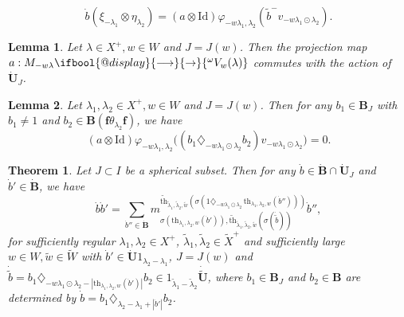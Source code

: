 \documentclass[10pt,a4paper]{amsart}
\makeatletter
\newtheorem{theorem}{Theorem}
\newtheorem{lemma}{Lemma}
\def\l{\lambda}
\renewcommand{\to}{%
   \ifbool{@display}{\longrightarrow}{\rightarrow}%
   }
\makeatother
\begin{document}
\begin{equation}\label{definition of thickening map}
\dot{b}(\xi_{-\lambda_1}\otimes \eta_{\lambda_2})=(a\otimes \mathrm{Id})\varphi_{-w\lambda_1,\lambda_2}(\tilde{b}^-v_{-w\lambda_1\odot\lambda_2}).   
\end{equation}

\begin{lemma}\label{lem:Demazure-UJ}
Let $\l \in X^+,w \in W$ and $J=J(w)$. Then the projection map $a: M_{-w \l} \to {^{\omega}V_{w}(\lambda)}$ commutes with the action of $\dot{\mathbf{U}}_J$.
\end{lemma}

\begin{lemma}\label{canonical basis of U dot acts on Verma}
Let $\lambda_1,\lambda_2\in X^+,w\in W$ and $J=J(w)$. Then for any $b_1\in \mathbf{B}_J$ with $b_1 \neq 1$ and $b_2\in \mathbf{B}(\mathbf{f}\theta_{\lambda_2}\mathbf{f})$, we have 
$$(a\otimes \mathrm{Id})\varphi_{-w\lambda_1,\lambda_2}\bigl((b_1\diamondsuit_{-w\lambda_1\odot\lambda_2}b_2)v_{-w\lambda_1\odot\lambda_2}\bigr)=0.$$
\end{lemma}

\begin{theorem}\label{thm:structure-multiplication}
Let $J \subset I$ be a spherical subset. Then for any $\dot{b}\in \dot{\mathbf{B}}\cap \dot{\mathbf{U}}_J$ and $\dot{b}'\in \dot{\mathbf{B}}$, we have
$$\dot{b}\dot{b}'=\sum_{\dot{b}''\in \dot{\mathbf{B}}}m_{\sigma(\mathrm{th}_{\lambda_1,\lambda_2,w}(\dot{b}')),\widetilde{\mathrm{th}}_{\tilde{\lambda}_1,\tilde{\lambda}_2,\tilde{w}}(\sigma(\dot{\tilde{b}}))}^{\widetilde{\mathrm{th}}_{\tilde{\lambda}_1,\tilde{\lambda}_2,\tilde{w}}(\sigma(1\diamondsuit_{-w\lambda_1\odot\lambda_2}\,\mathrm{th}_{\lambda_1,\lambda_2,w}(\dot{b}'')))}\dot{b}'',$$
for sufficiently regular $\l_1, \l_2 \in X^+$, $\tilde{\lambda}_1,\tilde{\lambda}_2\in \tilde{X}^+$ and sufficiently large $w\in W,\tilde{w}\in \tilde{W}$ with $\dot{b}' \in \dot{\mathbf{U}}1_{\lambda_2-\lambda_1}$, $J=J(w)$ and $\dot{\tilde{b}}=b_1\diamondsuit_{-w\lambda_1\odot\lambda_2-|\mathrm{th}_{\lambda_1,\lambda_2,w}(\dot{b}')|}b_2\in 1_{\tilde{\lambda}_1-\tilde{\lambda}_2}\dot{\tilde{\mathbf{U}}}$, where $b_1\in \mathbf{B}_J$ and $b_2\in \mathbf{B}$ are determined by $\dot{b}=b_1\diamondsuit_{\lambda_2-\lambda_1+|\dot{b}'|}b_2$.
\end{theorem} 
\end{document}

